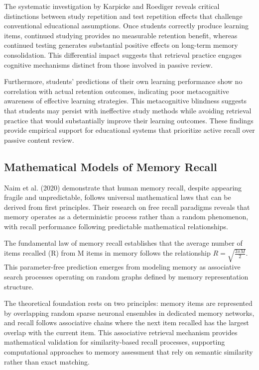 {\color{maroon}
The systematic investigation by Karpicke and Roediger reveals critical distinctions between study repetition and test repetition effects that challenge conventional educational assumptions. Once students correctly produce learning items, continued studying provides no measurable retention benefit, whereas continued testing generates substantial positive effects on long-term memory consolidation. This differential impact suggests that retrieval practice engages cognitive mechanisms distinct from those involved in passive review.

Furthermore, students' predictions of their own learning performance show no correlation with actual retention outcomes, indicating poor metacognitive awareness of effective learning strategies. This metacognitive blindness suggests that students may persist with ineffective study methods while avoiding retrieval practice that would substantially improve their learning outcomes. These findings provide empirical support for educational systems that prioritize active recall over passive content review.

\subsection{Mathematical Models of Memory Recall}

Naim et al. (2020) demonstrate that human memory recall, despite appearing fragile and unpredictable, follows universal mathematical laws that can be derived from first principles. Their research on free recall paradigms reveals that memory operates as a deterministic process rather than a random phenomenon, with recall performance following predictable mathematical relationships.

The fundamental law of memory recall establishes that the average number of items recalled (R) from M items in memory follows the relationship $R = \sqrt{\frac{3\pi M}{2}}$. This parameter-free prediction emerges from modeling memory as associative search processes operating on random graphs defined by memory representation structure.

The theoretical foundation rests on two principles: memory items are represented by overlapping random sparse neuronal ensembles in dedicated memory networks, and recall follows associative chains where the next item recalled has the largest overlap with the current item. This associative retrieval mechanism provides mathematical validation for similarity-based recall processes, supporting computational approaches to memory assessment that rely on semantic similarity rather than exact matching.
}

